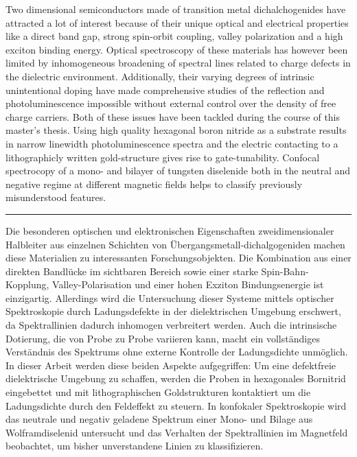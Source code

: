 
Two dimensional semiconductors made of transition metal dichalchogenides have attracted a lot of interest because of their unique optical and electrical properties like a direct band gap, strong spin-orbit coupling, valley polarization and a high exciton binding energy. Optical spectroscopy of these materials has however been limited by inhomogeneous broadening of spectral lines related to charge defects in the dielectric environment. Additionally, their varying degrees of intrinsic unintentional doping have made comprehensive studies of the reflection and photoluminescence impossible without external control over the density of free charge carriers. Both of these issues have been tackled during the course of this master's thesis. Using high quality hexagonal boron nitride as a substrate results in narrow linewidth photoluminescence spectra and the electric contacting to a lithographicly written gold-structure gives rise to gate-tunability. Confocal spectrocopy of a mono- and bilayer of tungsten diselenide both in the neutral and negative regime at different magnetic fields helps to classify previously misunderstood features.\newline
\begin{center}
\par\rule[8pt]{0.7\textwidth}{0.5pt}
\end{center}
Die besonderen optischen und elektronischen Eigenschaften zweidimensionaler Halbleiter aus einzelnen Schichten von Übergangsmetall-dichalgogeniden machen diese Materialien zu interessanten Forschungsobjekten. Die Kombination aus einer direkten Bandlücke im sichtbaren Bereich sowie einer starke Spin-Bahn-Kopplung, Valley-Polarisation und einer hohen Exziton Bindungsenergie ist einzigartig. Allerdings wird die Untersuchung dieser Systeme mittels optischer Spektroskopie durch Ladungsdefekte in der dielektrischen Umgebung erschwert, da Spektrallinien dadurch inhomogen verbreitert werden. Auch die intrinsische Dotierung, die von Probe zu Probe variieren kann, macht ein vollständiges Verständnis des Spektrums ohne externe Kontrolle der Ladungsdichte unmöglich. In dieser Arbeit werden diese beiden Aspekte aufgegriffen: Um eine defektfreie dielektrische Umgebung zu schaffen, werden die Proben in hexagonales Bornitrid eingebettet und mit lithographischen Goldstrukturen kontaktiert um die Ladungsdichte durch den Feldeffekt zu steuern. In konfokaler Spektroskopie wird das neutrale und negativ geladene Spektrum einer Mono- und Bilage aus Wolframdiselenid untersucht und das Verhalten der Spektrallinien im Magnetfeld beobachtet, um bisher unverstandene Linien zu klassifizieren.